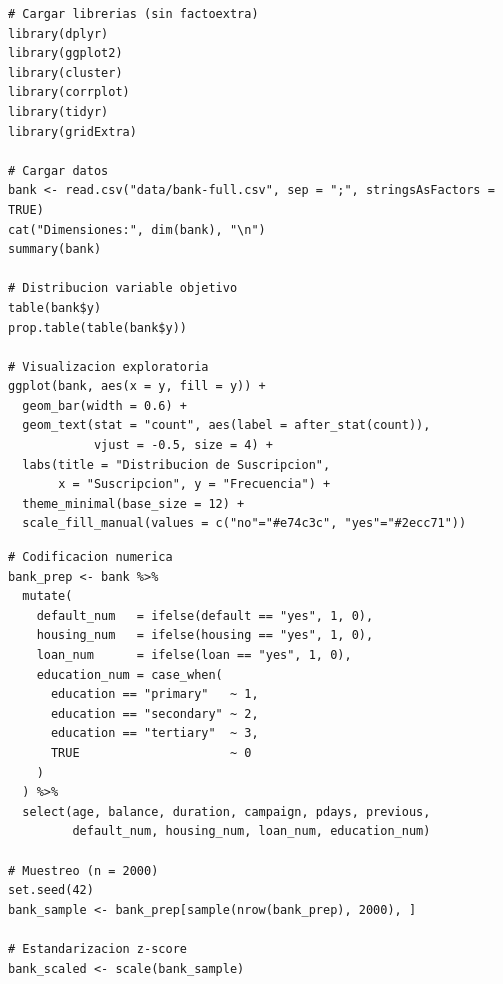 \documentclass[10pt,a4paper]{article}
\begin{document}
\begin{lstlisting}[caption={Carga de datos y análisis exploratorio (Fase 2).}]
# Cargar librerias (sin factoextra)
library(dplyr)
library(ggplot2)
library(cluster)
library(corrplot)
library(tidyr)
library(gridExtra)

# Cargar datos
bank <- read.csv("data/bank-full.csv", sep = ";", stringsAsFactors = TRUE)
cat("Dimensiones:", dim(bank), "\n")
summary(bank)

# Distribucion variable objetivo
table(bank$y)
prop.table(table(bank$y))

# Visualizacion exploratoria
ggplot(bank, aes(x = y, fill = y)) +
  geom_bar(width = 0.6) +
  geom_text(stat = "count", aes(label = after_stat(count)),
            vjust = -0.5, size = 4) +
  labs(title = "Distribucion de Suscripcion",
       x = "Suscripcion", y = "Frecuencia") +
  theme_minimal(base_size = 12) +
  scale_fill_manual(values = c("no"="#e74c3c", "yes"="#2ecc71"))
\end{lstlisting}

\begin{lstlisting}[caption={Preparación de datos y estandarización (Fase 3).}]
# Codificacion numerica
bank_prep <- bank %>%
  mutate(
    default_num   = ifelse(default == "yes", 1, 0),
    housing_num   = ifelse(housing == "yes", 1, 0),
    loan_num      = ifelse(loan == "yes", 1, 0),
    education_num = case_when(
      education == "primary"   ~ 1,
      education == "secondary" ~ 2,
      education == "tertiary"  ~ 3,
      TRUE                     ~ 0
    )
  ) %>%
  select(age, balance, duration, campaign, pdays, previous,
         default_num, housing_num, loan_num, education_num)

# Muestreo (n = 2000)
set.seed(42)
bank_sample <- bank_prep[sample(nrow(bank_prep), 2000), ]

# Estandarizacion z-score
bank_scaled <- scale(bank_sample)
\end{lstlisting}
\end{document}
